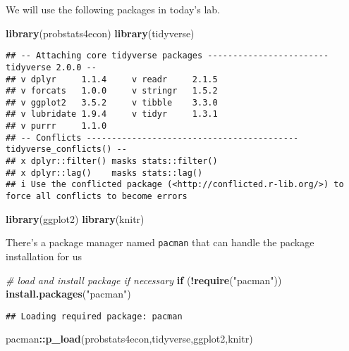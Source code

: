 \documentclass[
]{article}
\newenvironment{Shaded}{\begin{snugshade}}{\end{snugshade}}
\newcommand{\CommentTok}[1]{\textcolor[rgb]{0.56,0.35,0.01}{\textit{#1}}}
\newcommand{\ControlFlowTok}[1]{\textcolor[rgb]{0.13,0.29,0.53}{\textbf{#1}}}
\newcommand{\FunctionTok}[1]{\textcolor[rgb]{0.13,0.29,0.53}{\textbf{#1}}}
\newcommand{\NormalTok}[1]{#1}
\newcommand{\SpecialCharTok}[1]{\textcolor[rgb]{0.81,0.36,0.00}{\textbf{#1}}}
\newcommand{\StringTok}[1]{\textcolor[rgb]{0.31,0.60,0.02}{#1}}
\begin{document}
We will use the following packages in today's lab.

\begin{Shaded}
\begin{Highlighting}[]
\FunctionTok{library}\NormalTok{(probstats4econ)}
\FunctionTok{library}\NormalTok{(tidyverse)}
\end{Highlighting}
\end{Shaded}

\begin{verbatim}
## -- Attaching core tidyverse packages ------------------------ tidyverse 2.0.0 --
## v dplyr     1.1.4     v readr     2.1.5
## v forcats   1.0.0     v stringr   1.5.2
## v ggplot2   3.5.2     v tibble    3.3.0
## v lubridate 1.9.4     v tidyr     1.3.1
## v purrr     1.1.0     
## -- Conflicts ------------------------------------------ tidyverse_conflicts() --
## x dplyr::filter() masks stats::filter()
## x dplyr::lag()    masks stats::lag()
## i Use the conflicted package (<http://conflicted.r-lib.org/>) to force all conflicts to become errors
\end{verbatim}

\begin{Shaded}
\begin{Highlighting}[]
\FunctionTok{library}\NormalTok{(ggplot2)}
\FunctionTok{library}\NormalTok{(knitr)}
\end{Highlighting}
\end{Shaded}

There's a package manager named \texttt{pacman} that can handle the
package installation for us

\begin{Shaded}
\begin{Highlighting}[]
\CommentTok{\# load and install package if necessary}
\ControlFlowTok{if}\NormalTok{ (}\SpecialCharTok{!}\FunctionTok{require}\NormalTok{(}\StringTok{"pacman"}\NormalTok{)) }\FunctionTok{install.packages}\NormalTok{(}\StringTok{"pacman"}\NormalTok{)}
\end{Highlighting}
\end{Shaded}

\begin{verbatim}
## Loading required package: pacman
\end{verbatim}

\begin{Shaded}
\begin{Highlighting}[]
\NormalTok{pacman}\SpecialCharTok{::}\FunctionTok{p\_load}\NormalTok{(probstats4econ,tidyverse,ggplot2,knitr)}
\end{Highlighting}
\end{Shaded}
\end{document}
